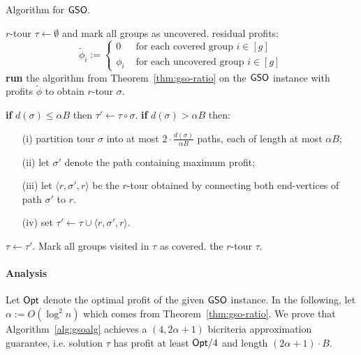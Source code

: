 \documentclass[11pt]{article}
\def\opt{{\sf Opt}\xspace}
\newcommand{\profit}{\phi}
\def\gso{\ensuremath{{\sf GSO}}\xspace}
\begin{document}
\begin{algorithm}[!h]
  \caption{Algorithm for \gso.}
\label{alg:gsoalg}
\begin{algorithmic}[1]
     $r$-tour $\tau\leftarrow \emptyset$ and mark  all groups as uncovered.
     residual profits:
      $$\widetilde{\profit}_i:=\left\{
        \begin{array}{ll}
          0 & \mbox{ for each covered group }i\in [g]\\
          \profit_i & \mbox{ for each uncovered group }i\in [g]
        \end{array}\right.
      $$
    \STATE\label{step:gso-ratio} {\bf run} the algorithm from Theorem~\ref{thm:gso-ratio} on the \gso instance with profits 
    $ \widetilde{\profit}$ to obtain $r$-tour $\sigma$.
    
    
   \STATE \label{step:gso-case1} {\bf if} $d(\sigma)\le \alpha B$ then
      $\tau'\leftarrow \tau\circ \sigma$.
    \STATE \label{step:gso-case2} {\bf if} $d(\sigma)> \alpha B$ then:
\begin{itemize}
\item[(i)] partition tour $\sigma$ into at most $2\cdot \frac{d(\sigma)}{\alpha B}$ paths,
      each of length at most $\alpha B$;
    \item[(ii)]  let $\sigma'$ denote the path containing maximum profit;
    \item[(iii)]  let $\langle r,\sigma',r\rangle$ be the $r$-tour obtained by connecting both end-vertices of path $\sigma'$ to $r$.
    \item[(iv)] set $\tau'\leftarrow \tau\cup \langle r,\sigma',r\rangle$.
    \end{itemize}
     $\tau\leftarrow \tau'$. Mark all groups visited in $\tau$ as
      covered.
  \ENDWHILE
   the $r$-tour $\tau$.
  \end{algorithmic}
\end{algorithm}

  \paragraph{Analysis}
  Let $\opt$ denote the optimal profit of the given \gso instance.
 In the following, let
  $\alpha:=O(\log^2n)$ which comes from Theorem~\ref{thm:gso-ratio}.
  We  prove that Algorithm~\ref{alg:gsoalg} achieves a $(4,2\alpha
  +1)$ bicriteria
  approximation guarantee, i.e. solution $\tau$ has profit at least $\opt/4$ and length $(2\alpha
  +1)\cdot B$. 
  
\end{document}
